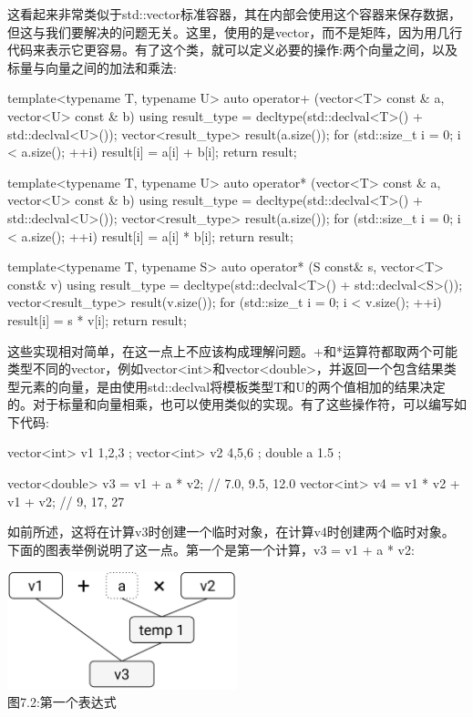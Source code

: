 这看起来非常类似于std::vector标准容器，其在内部会使用这个容器来保存数据，但这与我们要解决的问题无关。这里，使用的是vector，而不是矩阵，因为用几行代码来表示它更容易。有了这个类，就可以定义必要的操作:两个向量之间，以及标量与向量之间的加法和乘法:

\begin{cpp}
template<typename T, typename U>
auto operator+ (vector<T> const & a, vector<U> const & b)
{
	using result_type = decltype(std::declval<T>() +
	std::declval<U>());
	vector<result_type> result(a.size());
	for (std::size_t i = 0; i < a.size(); ++i)
	{
		result[i] = a[i] + b[i];
	}
	return result;
}

template<typename T, typename U>
auto operator* (vector<T> const & a, vector<U> const & b)
{
	using result_type = decltype(std::declval<T>() +
	std::declval<U>());
	vector<result_type> result(a.size());
	for (std::size_t i = 0; i < a.size(); ++i)
	{
		result[i] = a[i] * b[i];
	}
	return result;
}

template<typename T, typename S>
auto operator* (S const& s, vector<T> const& v)
{
	using result_type = decltype(std::declval<T>() +
	std::declval<S>());
	vector<result_type> result(v.size());
	for (std::size_t i = 0; i < v.size(); ++i)
	{
		result[i] = s * v[i];
	}
	return result;
}
\end{cpp}

这些实现相对简单，在这一点上不应该构成理解问题。+和*运算符都取两个可能类型不同的vector，例如vector<int>和vector<double>，并返回一个包含结果类型元素的向量，是由使用std::declval将模板类型T和U的两个值相加的结果决定的。对于标量和向量相乘，也可以使用类似的实现。有了这些操作符，可以编写如下代码:

\begin{cpp}
vector<int> v1{ 1,2,3 };
vector<int> v2{ 4,5,6 };
double a{ 1.5 };

vector<double> v3 = v1 + a * v2; // {7.0, 9.5, 12.0}
vector<int> v4 = v1 * v2 + v1 + v2; // {9, 17, 27}
\end{cpp}

如前所述，这将在计算v3时创建一个临时对象，在计算v4时创建两个临时对象。下面的图表举例说明了这一点。第一个是第一个计算，v3 = v1 + a * v2:

\begin{center}
\includegraphics[width=0.5\textwidth]{images/2.png}\\
图7.2:第一个表达式
\end{center}

